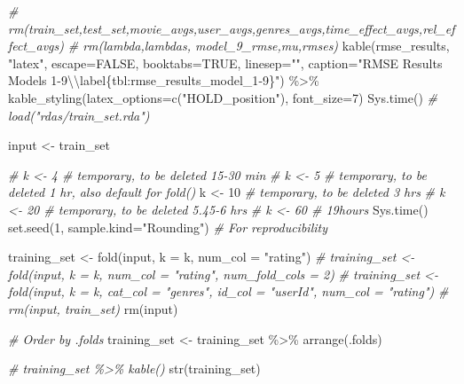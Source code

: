 \documentclass[
]{article}
\newenvironment{Shaded}{}{}
\newcommand{\AttributeTok}[1]{\textcolor[rgb]{0.49,0.56,0.16}{#1}}
\newcommand{\CommentTok}[1]{\textcolor[rgb]{0.38,0.63,0.69}{\textit{#1}}}
\newcommand{\ConstantTok}[1]{\textcolor[rgb]{0.53,0.00,0.00}{#1}}
\newcommand{\DecValTok}[1]{\textcolor[rgb]{0.25,0.63,0.44}{#1}}
\newcommand{\FunctionTok}[1]{\textcolor[rgb]{0.02,0.16,0.49}{#1}}
\newcommand{\NormalTok}[1]{#1}
\newcommand{\OtherTok}[1]{\textcolor[rgb]{0.00,0.44,0.13}{#1}}
\newcommand{\SpecialCharTok}[1]{\textcolor[rgb]{0.25,0.44,0.63}{#1}}
\newcommand{\StringTok}[1]{\textcolor[rgb]{0.25,0.44,0.63}{#1}}
\begin{document}
\begin{Shaded}
\begin{Highlighting}[]
\CommentTok{\# rm(train\_set,test\_set,movie\_avgs,user\_avgs,genres\_avgs,time\_effect\_avgs,rel\_effect\_avgs)}
\CommentTok{\# rm(lambda,lambdas, model\_9\_rmse,mu,rmses)}
  \FunctionTok{kable}\NormalTok{(rmse\_results, }\StringTok{"latex"}\NormalTok{, }\AttributeTok{escape=}\ConstantTok{FALSE}\NormalTok{, }\AttributeTok{booktabs=}\ConstantTok{TRUE}\NormalTok{, }\AttributeTok{linesep=}\StringTok{""}\NormalTok{, }\AttributeTok{caption=}\StringTok{"RMSE Results Models 1{-}9}\SpecialCharTok{\textbackslash{}\textbackslash{}}\StringTok{label\{tbl:rmse\_results\_model\_1{-}9\}"}\NormalTok{) }\SpecialCharTok{\%\textgreater{}\%}
    \FunctionTok{kable\_styling}\NormalTok{(}\AttributeTok{latex\_options=}\FunctionTok{c}\NormalTok{(}\StringTok{"HOLD\_position"}\NormalTok{), }\AttributeTok{font\_size=}\DecValTok{7}\NormalTok{)}
\FunctionTok{Sys.time}\NormalTok{()}
\CommentTok{\# load("rdas/train\_set.rda")}

\NormalTok{input }\OtherTok{\textless{}{-}}\NormalTok{ train\_set}

\CommentTok{\# k \textless{}{-} 4 \# temporary, to be deleted  15{-}30 min}
\CommentTok{\# k \textless{}{-} 5 \# temporary, to be deleted  1 hr, also default for fold()}
\NormalTok{k }\OtherTok{\textless{}{-}} \DecValTok{10} \CommentTok{\# temporary, to be deleted 3 hrs}
\CommentTok{\# k \textless{}{-} 20 \# temporary, to be deleted 5.45{-}6 hrs}
\CommentTok{\# k \textless{}{-} 60 \#                          19hours}
\FunctionTok{Sys.time}\NormalTok{()}
\FunctionTok{set.seed}\NormalTok{(}\DecValTok{1}\NormalTok{, }\AttributeTok{sample.kind=}\StringTok{"Rounding"}\NormalTok{) }\CommentTok{\# For reproducibility}

\NormalTok{training\_set }\OtherTok{\textless{}{-}} \FunctionTok{fold}\NormalTok{(input, }\AttributeTok{k =}\NormalTok{ k, }\AttributeTok{num\_col =} \StringTok{"rating"}\NormalTok{)}
\CommentTok{\# training\_set \textless{}{-} fold(input, k = k, num\_col = "rating", num\_fold\_cols = 2)}
\CommentTok{\# training\_set \textless{}{-} fold(input, k = k, cat\_col = "genres", id\_col = "userId", num\_col = "rating")}
\CommentTok{\# rm(input, train\_set)}
\FunctionTok{rm}\NormalTok{(input)}

\CommentTok{\# Order by .folds}
\NormalTok{training\_set }\OtherTok{\textless{}{-}}\NormalTok{ training\_set }\SpecialCharTok{\%\textgreater{}\%} \FunctionTok{arrange}\NormalTok{(.folds)}

\CommentTok{\# training\_set \%\textgreater{}\% kable()}
\FunctionTok{str}\NormalTok{(training\_set)}


\end{Highlighting}
\end{Shaded}
\end{document}

